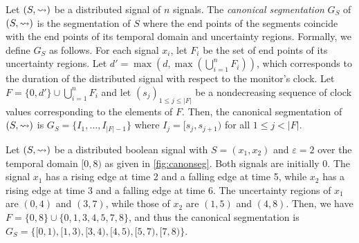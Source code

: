 
Let $(S,{\rightsquigarrow})$ be a distributed signal of $n$ signals.
The \emph{canonical segmentation} $G_S$ of $(S,{\rightsquigarrow})$ is the segmentation of $S$ where the end points of the segments coincide with the end points of its temporal domain and uncertainty regions.
Formally, we define $G_S$ as follows.
For each signal $x_i$, let $F_i$ be the set of end points of its uncertainty regions.
Let $d' = \max(d, \max (\bigcup_{i = 1}^{n} F_i))$, which corresponds to the duration of the distributed signal with respect to the monitor's clock.
%
Let $F = \{0, d'\} \cup \bigcup_{i = 1}^{n} F_i$ and let $(s_j)_{1 \leq j \leq |F|}$ be a nondecreasing sequence of clock values corresponding to the elements of $F$.
Then, the canonical segmentation of $(S,{\rightsquigarrow})$ is $G_S = \{I_1, \ldots, I_{|F| - 1}\}$ where $I_j = [s_j, s_{j+1})$ for all $1 \leq j < |F|$.

\begin{example} \label{ex:canonseg}
	Let $(S, {\rightsquigarrow})$ be a distributed boolean signal with $S = (x_1, x_2)$ and $\varepsilon = 2$ over the temporal domain $[0,8)$ as given in \cref{fig:canonseg}.
	Both signals are initially 0.
	The signal $x_1$ has a rising edge at time 2 and a falling edge at time 5, while $x_2$ has a rising edge at time 3 and a falling edge at time 6.
	The uncertainty regions of $x_1$ are $(0,4)$ and $(3,7)$, while those of $x_2$ are $(1,5)$ and $(4,8)$.
	Then, we have $F = \{0, 8\} \cup \{0, 1, 3, 4, 5, 7, 8\}$, and thus the canonical segmentation is $G_S = \{ [0,1), [1,3), [3,4), [4,5), [5,7), [7,8) \}$.
\end{example}

